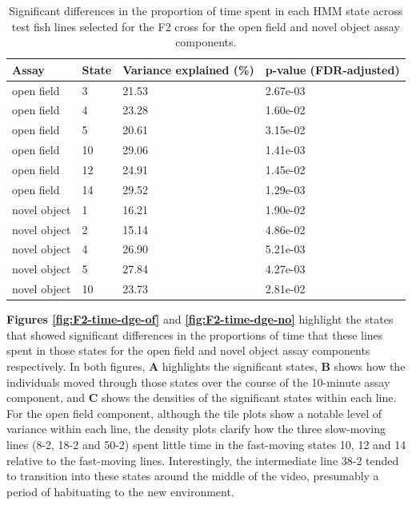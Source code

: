 \documentclass[
]{book}
\begin{document}
\begin{table}

\caption{\label{tab:mikk-dge-F0}Significant differences in the proportion of time spent in each HMM state across test fish lines selected for the F2 cross for the open field and novel object assay components.}
\centering
\begin{tabular}[t]{llll}
\toprule
Assay & State & Variance explained (\%) & p-value (FDR-adjusted)\\
\midrule
open field & 3 & 21.53 & 2.67e-03\\
open field & 4 & 23.28 & 1.60e-02\\
open field & 5 & 20.61 & 3.15e-02\\
open field & 10 & 29.06 & 1.41e-03\\
open field & 12 & 24.91 & 1.45e-02\\
\addlinespace
open field & 14 & 29.52 & 1.29e-03\\
novel object & 1 & 16.21 & 1.90e-02\\
novel object & 2 & 15.14 & 4.86e-02\\
novel object & 4 & 26.90 & 5.21e-03\\
novel object & 5 & 27.84 & 4.27e-03\\
\addlinespace
novel object & 10 & 23.73 & 2.81e-02\\
\bottomrule
\end{tabular}
\end{table}

\textbf{Figures \ref{fig:F2-time-dge-of}} and \textbf{\ref{fig:F2-time-dge-no}} highlight the states that showed significant differences in the proportions of time that these lines spent in those states for the open field and novel object assay components respectively. In both figures, \textbf{A} highlights the significant states, \textbf{B} shows how the individuals moved through those states over the course of the 10-minute assay component, and \textbf{C} shows the densities of the significant states within each line. For the open field component, although the tile plots show a notable level of variance within each line, the density plots clarify how the three slow-moving lines (8-2, 18-2 and 50-2) spent little time in the fast-moving states 10, 12 and 14 relative to the fast-moving lines. Interestingly, the intermediate line 38-2 tended to transition into these states around the middle of the video, presumably a period of habituating to the new environment.
\end{document}
